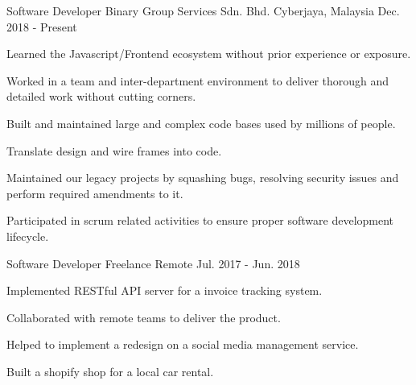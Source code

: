 

\begin{cventries}

  \cventry
    {Software Developer} %
    {Binary Group Services Sdn. Bhd.} %
    {Cyberjaya, Malaysia} %
    {Dec. 2018 - Present} %
    {
      \begin{cvitems} %
        \item {Learned the Javascript/Frontend ecosystem without prior experience or exposure.}
        \item {Worked in a team and inter-department environment to deliver thorough and detailed work without cutting corners.}
        \item {Built and maintained large and complex code bases used by millions of people.}
        \item {Translate design and wire frames into code.}
        \item {Maintained our legacy projects by squashing bugs, resolving security issues and perform required amendments to it.}
        \item {Participated in scrum related activities to ensure proper software development lifecycle.}
      \end{cvitems}
    }

  \cventry
    {Software Developer} %
    {Freelance} %
    {Remote} %
    {Jul. 2017 - Jun. 2018} %
    {
      \begin{cvitems} %
        \item {Implemented RESTful API server for a invoice tracking system.}
        \item {Collaborated with remote teams to deliver the product.}
        \item {Helped to implement a redesign on a social media management service.}
        \item {Built a shopify shop for a local car rental.}
      \end{cvitems}
    }
\end{cventries}
